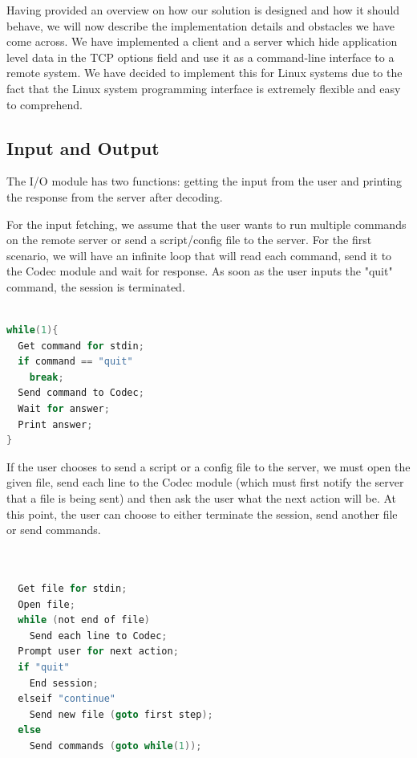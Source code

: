 Having provided an overview on how our solution is designed and how it should
behave, we will now describe the implementation details and obstacles we have
come across. We have implemented a client and a server which hide application
level data in the TCP options field and use it as a command-line interface to
a remote system. We have decided to implement this for Linux systems due to
the fact that the Linux system programming interface is extremely flexible and easy
to comprehend.

\subsection{Input and Output}


The I/O module has two functions: getting the input from the user and printing
the response from the server after decoding.

For the input fetching, we assume that the user wants to run multiple commands
on the remote server or send a script/config file to the server. For the first
scenario, we will have an infinite loop that will read each command, send it to 
the Codec module and wait for response. As soon as the user inputs the "quit"
command, the session is terminated.

\begin{lstlisting}[caption={Basic command processing},
                   label={lst:our-tcphdr},
                   basicstyle=\footnotesize,
                   captionpos=b,
                   frame=single,
                   language=C
                  ]

while(1){
  Get command for stdin;
  if command == "quit"
    break;
  Send command to Codec;
  Wait for answer;
  Print answer;
}
\end{lstlisting}

If the user chooses to send a script or a config file to the server, we must open
the given file, send each line to the Codec module (which must first notify the server 
that a file is being sent) and then ask the user what the next action will be. At this
point, the user can choose to either terminate the session, send another file or send 
commands. 

\begin{lstlisting}[caption={File processing},
                   label={lst:our-tcphdr},
                   basicstyle=\footnotesize,
                   captionpos=b,
                   frame=single,
                   language=C
                  ]


  Get file for stdin;
  Open file;
  while (not end of file)
    Send each line to Codec;
  Prompt user for next action;
  if "quit"
    End session;
  elseif "continue"
    Send new file (goto first step);
  else
    Send commands (goto while(1));

\end{lstlisting}

